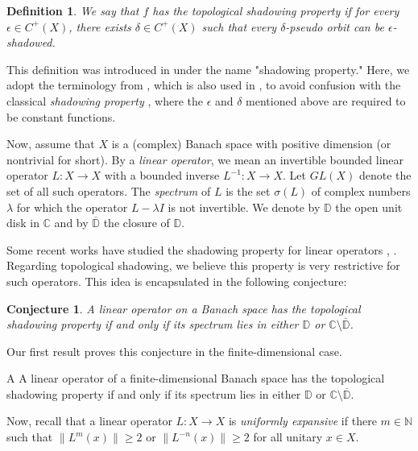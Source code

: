 \documentclass[11pt,letterpaper]{amsart}
\newtheorem{definition}{Definition}
\newtheorem*{problem}{Conjecture}
\numberwithin{equation}{section}
\begin{document}
\begin{definition}
We say that \( f \) has the {\em topological shadowing property} if for every \( \epsilon \in C^+(X) \), there exists \( \delta \in C^+(X) \) such that every \( \delta \)-pseudo orbit can be \( \epsilon \)-shadowed.
\end{definition}

This definition was introduced in \cite{lny} under the name "shadowing property." Here, we adopt the terminology from \cite{dlrw}, which is also used in \cite{c}, to avoid confusion with the classical {\em shadowing property} \cite{b}, where the \(\epsilon\) and \(\delta\) mentioned above are required to be constant functions.

Now, assume that \( X \) is a (complex) Banach space with positive dimension (or nontrivial for short). By a {\em linear operator}, we mean an invertible bounded linear operator \( L: X \to X \) with a bounded inverse \( L^{-1}: X \to X \). Let \( GL(X) \) denote the set of all such operators. The {\em spectrum} of \( L \) is the set $\sigma(L)$ of complex numbers \( \lambda \) for which the operator \( L - \lambda I \) is not invertible. We denote by \( \mathbb{D} \) the open unit disk in \( \mathbb{C} \) and by \( \overline{\mathbb{D}} \) the closure of \( \mathbb{D} \).

Some recent works have studied the shadowing property for linear operators \cite{bm}, \cite{bcdmp}. Regarding topological shadowing, we believe this property is very restrictive for such operators. This idea is encapsulated in the following conjecture:

\begin{problem}
A linear operator on a Banach space has the topological shadowing property if and only if its spectrum lies in either $\mathbb{D}$ or $\mathbb{C} \setminus \overline{\mathbb{D}}$.
\end{problem}

Our first result proves this conjecture in the finite-dimensional case.

\begin{customthm}{A}
\label{c0}
A linear operator of a finite-dimensional Banach space has the topological shadowing property if and only if its spectrum lies in either $\mathbb{D}$ or $\mathbb{C} \setminus \overline{\mathbb{D}}$.
\end{customthm}

Now, recall that a linear operator $L:X\to X$ is {\em uniformly expansive} \cite{h} if there $m\in\mathbb{N}$ such that
$\|L^m(x)\|\geq 2$ or $\|L^{-n}(x)\|\geq 2$ for all unitary $x\in X$.
\end{document}
